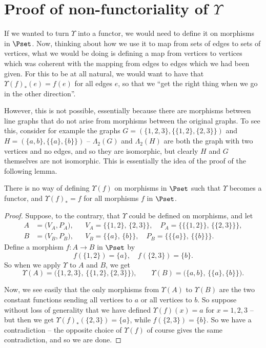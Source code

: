 \documentclass[a4paper,reqno,oneside]{article} %
\begin{document}
\section{Proof of non-functoriality of \texorpdfstring{$\Upsilon$}{Upsilon}}

If we wanted to turn $\Upsilon$ into a functor, we would need to define it on morphisms in $\Pset$. Now, thinking about how we use it to map from sets of edges to sets of vertices, what we would be doing is defining a map from vertices to vertices which was coherent with the mapping from edges to edges which we had been given. For this to be at all natural, we would want to have that $\Upsilon(f)_*(e) = f(e)$ for all edges $e$, so that we ``get the right thing when we go in the other direction''.

However, this is not possible, essentially because there are morphisms between line graphs that do not arise from morphisms between the original graphs. To see this, consider for example the graphs $G = (\{1,2,3\}, \{\{1,2\}, \{2,3\}\})$ and $H = (\{a,b\}, \{\{a\}, \{b\}\})$ -- $\Lambda_2(G)$ and $\Lambda_2(H)$ are both the graph with two vertices and no edges, and so they are isomorphic, but clearly $H$ and $G$ themselves are not isomorphic. This is essentially the idea of the proof of the following lemma.

\begin{lemma}\label{lemma:Upsilon_not_functorial}
    There is no way of defining $\Upsilon(f)$ on morphisms in $\Pset$ such that $\Upsilon$ becomes a functor, and $\Upsilon(f)_* = f$ for all morphisms $f$ in $\Pset$.
\end{lemma}
    
\begin{proof}
    Suppose, to the contrary, that $\Upsilon$ could be defined on morphisms, and let
    \[
    \begin{aligned}
    A &= \bigl(V_A,P_A\bigr),
    &&
    V_A=\bigl\{\{1,2\},\,\{2,3\}\bigr\},\quad
    P_A=\bigl\{\{\{1,2\}\},\,\{\{2,3\}\}\bigr\},\\
    B &= \bigl(V_B,P_B\bigr),
    &&
    V_B=\bigl\{\{a\},\,\{b\}\bigr\},\quad
    P_B=\bigl\{\{\{a\}\},\,\{\{b\}\}\bigr\}.
    \end{aligned}
    \]
    Define a morphism \(f\colon A\to B\) in \(\Pset\) by
    \[
    f(\{1,2\})=\{a\}, 
    \quad
    f(\{2,3\})=\{b\}.
    \]
    So when we apply \(\Upsilon\) to $A$ and $B$, we get
    \[
    \Upsilon(A)
    =\bigl(\{1,2,3\},\,\{\{1,2\},\{2,3\}\}\bigr),
    \qquad
    \Upsilon(B)
    =\bigl(\{a,b\},\,\{\{a\},\{b\}\}\bigr).
    \]
    
    Now, we see easily that the only morphisms from $\Upsilon(A)$ to $\Upsilon(B)$ are the two constant functions sending all vertices to $a$ or all vertices to $b$. So suppose without loss of generality that we have defined $\Upsilon(f)(x) = a$ for $x = 1,2,3$ -- but then we get $\Upsilon(f)_*(\{2,3\}) = \{a\}$, while $f(\{2,3\}) = \{b\}$. So we have a contradiction -- the opposite choice of $\Upsilon(f)$ of course gives the same contradiction, and so we are done.
\end{proof}
       
    
\end{document}
